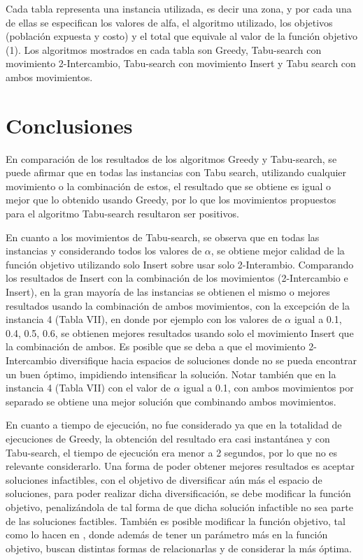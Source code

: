 \documentclass[conference]{IEEEtran}
\begin{document}
\clearpage
Cada tabla representa una instancia utilizada, es decir una zona, y por cada una de ellas se especifican los valores de alfa, el algoritmo utilizado, los objetivos (poblaci\'on expuesta y costo) y el total que equivale al valor de la funci\'on objetivo (1). Los algoritmos mostrados en cada tabla son Greedy, Tabu-search con movimiento 2-Intercambio, Tabu-search con movimiento Insert y Tabu search con ambos movimientos.
\section{Conclusiones}

En comparaci\'on de los resultados de los algoritmos Greedy y Tabu-search, se puede afirmar que en todas las instancias con Tabu search, utilizando cualquier movimiento o la combinaci\'on de estos, el resultado que se obtiene es igual o mejor que lo obtenido usando Greedy, por lo que los movimientos propuestos para el algoritmo Tabu-search resultaron ser positivos.

En cuanto a los movimientos de Tabu-search, se observa que en todas las instancias y considerando todos los valores de $\alpha$, se obtiene mejor calidad de la funci\'on objetivo utilizando solo Insert sobre usar solo 2-Interambio. Comparando los resultados de Insert con la combinaci\'on de los movimientos (2-Intercambio e Insert), en la gran mayor\'ia de las instancias se obtienen el mismo o mejores resultados usando la combinaci\'on de ambos movimientos, con la excepci\'on de la instancia 4 (Tabla VII), en donde por ejemplo con los valores de $\alpha$ igual a 0.1, 0.4, 0.5, 0.6, se obtienen mejores resultados usando solo el movimiento Insert que la combinaci\'on de ambos. Es posible que se deba a que el movimiento 2-Intercambio diversifique hacia espacios de soluciones donde no se pueda encontrar un buen \'optimo, impidiendo intensificar la soluci\'on. Notar tambi\'en que en la instancia 4 (Tabla VII) con el valor de $\alpha$ igual a 0.1, con ambos movimientos por separado se obtiene una mejor soluci\'on que combinando ambos movimientos.

En cuanto a tiempo de ejecuci\'on, no fue considerado ya que en la totalidad de ejecuciones de Greedy, la obtenci\'on del resultado era casi instant\'anea y con Tabu-search, el tiempo de ejecuci\'on era menor a 2 segundos, por lo que no es relevante considerarlo. Una forma de poder obtener mejores resultados es aceptar soluciones infactibles, con el objetivo de diversificar a\'un m\'as el espacio de soluciones, para poder realizar dicha diversificaci\'on, se debe modificar la funci\'on objetivo, penaliz\'andola de tal forma de que dicha soluci\'on infactible no sea parte de las soluciones factibles. Tambi\'en es posible modificar la funci\'on objetivo, tal como lo hacen en \cite{b1}, donde adem\'as de tener un par\'ametro m\'as en la funci\'on objetivo, buscan distintas formas de relacionarlas y de considerar la m\'as \'optima.
\end{document}
